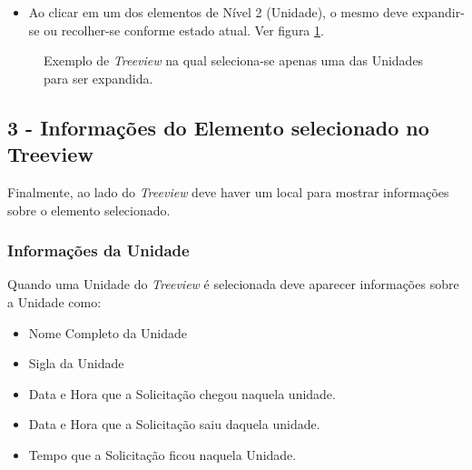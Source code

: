 	\begin{itemize}
		\item Ao clicar em um dos elementos de Nível 2 (Unidade), o mesmo deve expandir-se ou recolher-se conforme estado atual. Ver figura \ref{tree:ex4}.
	\end{itemize}


    \begin{figure}[htbp!]
	\caption{Exemplo de \emph{Treeview} na qual seleciona-se apenas uma das Unidades para ser expandida.}
	\label{tree:ex4}
\end{figure}	

			

	\subsection{3 - Informações do Elemento selecionado no Treeview}
	
	Finalmente, ao lado do \emph{Treeview} deve haver um local para mostrar informações sobre o elemento selecionado. 
	
	
	\subsubsection{Informações da Unidade \msUnd}

		Quando uma Unidade do \emph{Treeview} é selecionada deve aparecer informações sobre a Unidade como:
		
		\begin{itemize}
			\item Nome Completo da Unidade
			\item Sigla da Unidade
			\item Data e Hora que a Solicitação chegou naquela unidade.
			\item Data e Hora que a Solicitação saiu daquela unidade.			
			\item Tempo que a Solicitação ficou naquela Unidade.			
		\end{itemize}
		
